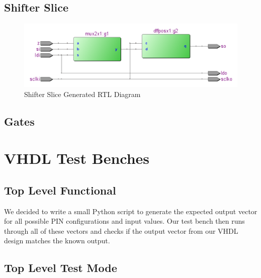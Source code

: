     \subsection{Shifter Slice}
        
        \begin{figure}[H]
            \centering
            \includegraphics[width=\linewidth]{../../doc/rtl_pics/shift_slice_rtl.png}
            \caption{Shifter Slice Generated RTL Diagram}
        \end{figure}
    \newpage
    \subsection{Gates}
        
        
        
        

\section{VHDL Test Benches}
    \subsection{Top Level Functional}
        
        We decided to write a small Python script to generate the expected
        output vector for all possible PIN configurations and input values. Our
        test bench then runs through all of these vectors and checks if the
        output vector from our VHDL design matches the known output.
        
    \newpage
    \subsection{Top Level Test Mode}
        
